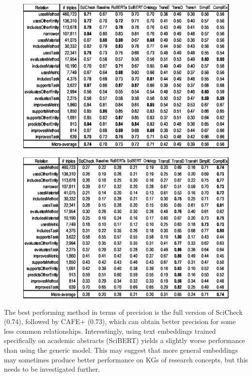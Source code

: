 \begin{figure}[!h]
    \centering
    \includegraphics[width=\textwidth]{fig/scicheck/table_p}
    \label{fig:sci-table_p}
\end{figure}

\begin{figure}[!h]
    \centering
    \includegraphics[width=\textwidth]{fig/scicheck/table_r}
    \label{fig:sci-table_r}
\end{figure}

The best performing method in terms of precision is the full version of SciCheck (0.74), followed by CAFE+\roberta{} (0.73), which can obtain better precision for some less common relationships. 
Interestingly, using text embeddings trained specifically on academic abstracts (SciBERT) yields a slightly worse performance than using the generic \roberta{} model. This may suggest that more general embeddings may sometimes produce better performance on KGs of research concepts, but this needs to be investigated further.

